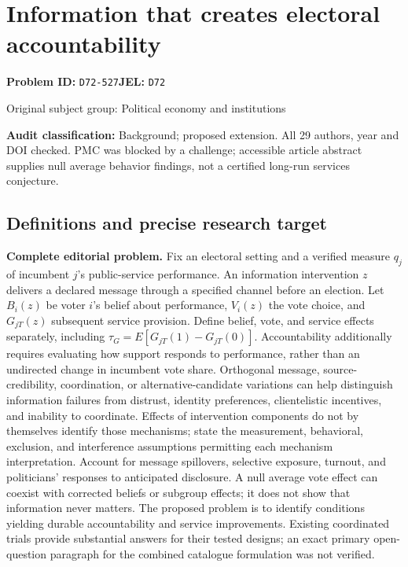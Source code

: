 \documentclass[11pt,a4paper]{article}
\begin{document}
\section*{Information that creates electoral accountability}
\textbf{Problem ID:} \texttt{D72-527}\quad \textbf{JEL:} \texttt{D72}\par
\label{problem:OP-0387}
{\sffamily\small\color{muted}Original subject group: Political economy and institutions\par}
\label{definitions:problem:30007669}
\textbf{Audit classification:} Background; proposed extension. All 29 authors, year and DOI checked. PMC was blocked by a challenge; accessible article abstract supplies null average behavior findings, not a certified long-run services conjecture.
\subsection*{Definitions and precise research target}
\textbf{Complete editorial problem.} Fix an electoral setting and a verified measure \(q_j\) of incumbent \(j\)'s public-service performance. An information intervention \(z\) delivers a declared message through a specified channel before an election. Let \(B_i(z)\) be voter \(i\)'s belief about performance, \(V_i(z)\) the vote choice, and \(G_{jT}(z)\) subsequent service provision. Define belief, vote, and service effects separately, including \(\tau_G=E[G_{jT}(1)-G_{jT}(0)]\). Accountability additionally requires evaluating how support responds to performance, rather than an undirected change in incumbent vote share. Orthogonal message, source-credibility, coordination, or alternative-candidate variations can help distinguish information failures from distrust, identity preferences, clientelistic incentives, and inability to coordinate. Effects of intervention components do not by themselves identify those mechanisms; state the measurement, behavioral, exclusion, and interference assumptions permitting each mechanism interpretation. Account for message spillovers, selective exposure, turnout, and politicians' responses to anticipated disclosure. A null average vote effect can coexist with corrected beliefs or subgroup effects; it does not show that information never matters. The proposed problem is to identify conditions yielding durable accountability and service improvements. Existing coordinated trials provide substantial answers for their tested designs; an exact primary open-question paragraph for the combined catalogue formulation was not verified.
\end{document}
